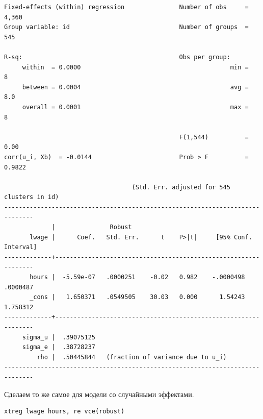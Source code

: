 \documentclass[]{book}
\begin{document}
\begin{verbatim}
Fixed-effects (within) regression               Number of obs     =      4,360
Group variable: id                              Number of groups  =        545

R-sq:                                           Obs per group:
     within  = 0.0000                                         min =          8
     between = 0.0004                                         avg =        8.0
     overall = 0.0001                                         max =          8

                                                F(1,544)          =       0.00
corr(u_i, Xb)  = -0.0144                        Prob > F          =     0.9822

                                   (Std. Err. adjusted for 545 clusters in id)
------------------------------------------------------------------------------
             |               Robust
       lwage |      Coef.   Std. Err.      t    P>|t|     [95% Conf. Interval]
-------------+----------------------------------------------------------------
       hours |  -5.59e-07   .0000251    -0.02   0.982    -.0000498    .0000487
       _cons |   1.650371   .0549505    30.03   0.000      1.54243    1.758312
-------------+----------------------------------------------------------------
     sigma_u |  .39075125
     sigma_e |  .38728237
         rho |  .50445844   (fraction of variance due to u_i)
------------------------------------------------------------------------------
\end{verbatim}

Сделаем то же самое для модели со случайными эффектами.

\begin{verbatim}
xtreg lwage hours, re vce(robust)
\end{verbatim}
\end{document}
